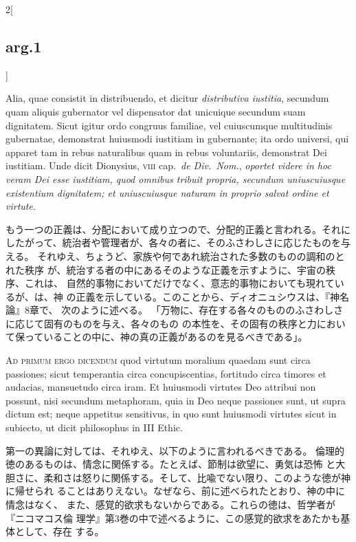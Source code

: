 \documentclass[paper=a4paper,fontsize=10pt,jafontsize=9pt,titlepage]{jlreq}
\begin{document}
\begin{paracol}{2}[\subsection{arg.1}]
\switchcolumn*

Alia, quae consistit
in distribuendo, et dicitur {\itshape distributiva iustitia}, secundum quam aliquis
gubernator vel dispensator dat unicuique secundum suam dignitatem. Sicut
igitur ordo congruus familiae, vel cuiuscumque multitudinis gubernatae,
demonstrat huiusmodi iustitiam in gubernante; ita ordo universi, qui
apparet tam in rebus naturalibus quam in rebus voluntariis, demonstrat
Dei iustitiam. Unde dicit Dionysius, {\scshape viii} cap.~{\itshape de Div.~Nom.}, {\itshape oportet
videre in hoc veram Dei esse iustitiam, quod omnibus tribuit propria,
secundum uniuscuiusque existentium dignitatem; et uniuscuiusque naturam
in proprio salvat ordine et virtute}.

\switchcolumn

もう一つの正義は、分配において成り立つので、分配的正義と言われる。それに
 したがって、統治者や管理者が、各々の者に、そのふさわしさに応じたものを与える。
それゆえ、ちょうど、家族や何であれ統治された多数のものの調和のとれた秩序
 が、統治する者の中にあるそのような正義を示すように、宇宙の秩序、これは、
 自然的事物においてだけでなく、意志的事物においても現れているが、は、神
 の正義を示している。このことから、ディオニュシウスは、『神名論』8章で、
 次のように述べる。
「万物に、存在する各々のもののふさわしさに応じて固有のものを与え、各々のもの
 の本性を、その固有の秩序と力において保っていることの中に、神の真の正義があるのを見るべきである」。

\switchcolumn*[\subsection{ad.1}]

{\scshape Ad primum ergo dicendum} quod virtutum
moralium quaedam sunt circa passiones; sicut temperantia circa
concupiscentias, fortitudo circa timores et audacias, mansuetudo circa
iram. Et huiusmodi virtutes Deo attribui non possunt, nisi secundum
metaphoram, quia in Deo neque passiones sunt, ut supra dictum est; neque
appetitus sensitivus, in quo sunt huiusmodi virtutes sicut in subiecto,
ut dicit philosophus in III Ethic.

\switchcolumn

第一の異論に対しては、それゆえ、以下のように言われるべきである。
倫理的徳のあるものは、情念に関係する。たとえば、節制は欲望に、勇気は恐怖
 と大胆さに、柔和さは怒りに関係する。そして、比喩でない限り、このような徳が神に帰せられ
 ることはありえない。なぜなら、前に述べられたとおり、神の中に情念はなく、
 また、感覚的欲求もないからである。これらの徳は、哲学者が『ニコマコス倫
 理学』第3巻の中で述べるように、この感覚的欲求をあたかも基体として、存在
 する。


\end{paracol}
\end{document}
